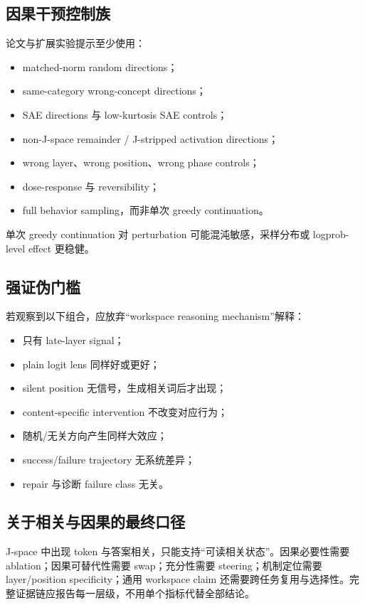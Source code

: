 \documentclass[10.5pt,a4paper]{ctexart}
\begin{document}
\subsection{因果干预控制族}
论文与扩展实验提示至少使用：
\begin{itemize}
  \item matched-norm random directions；
  \item same-category wrong-concept directions；
  \item SAE directions 与 low-kurtosis SAE controls；
  \item non-J-space remainder / J-stripped activation directions；
  \item wrong layer、wrong position、wrong phase controls；
  \item dose-response 与 reversibility；
  \item full behavior sampling，而非单次 greedy continuation。
\end{itemize}
单次 greedy continuation 对 perturbation 可能混沌敏感，采样分布或 logprob-level effect 更稳健。

\subsection{强证伪门槛}
若观察到以下组合，应放弃“workspace reasoning mechanism”解释：
\begin{itemize}
  \item 只有 late-layer signal；
  \item plain logit lens 同样好或更好；
  \item silent position 无信号，生成相关词后才出现；
  \item content-specific intervention 不改变对应行为；
  \item 随机/无关方向产生同样大效应；
  \item success/failure trajectory 无系统差异；
  \item repair 与诊断 failure class 无关。
\end{itemize}

\subsection{关于相关与因果的最终口径}
J-space 中出现 token 与答案相关，只能支持“可读相关状态”。因果必要性需要 ablation；因果可替代性需要 swap；充分性需要 steering；机制定位需要 layer/position specificity；通用 workspace claim 还需要跨任务复用与选择性。完整证据链应报告每一层级，不用单个指标代替全部结论。
\end{document}
